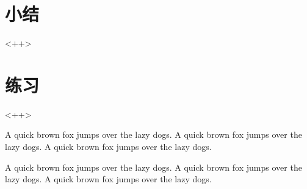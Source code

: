 \section{小结}<++>

\section{练习}<++>

A quick brown fox jumps over the lazy dogs.
A quick brown fox jumps over the lazy dogs.
A quick brown fox jumps over the lazy dogs.

A quick brown fox jumps over the lazy dogs.
A quick brown fox jumps over the lazy dogs.
A quick brown fox jumps over the lazy dogs.

\newpage{\thispagestyle{empty}\cleardoublepage}

